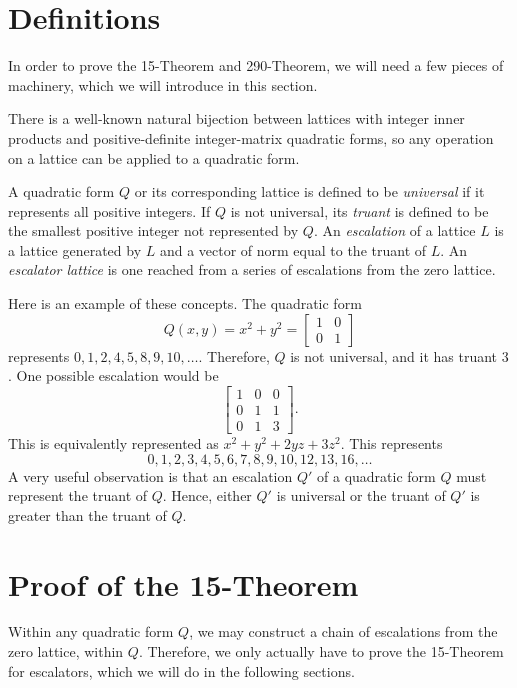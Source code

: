 \documentclass[letterpaper, 12pt]{article}
\begin{document}
\section{Definitions}
In order to prove the 15-Theorem and 290-Theorem, we will need a few pieces of machinery, which we will introduce in this section.

There is a well-known natural bijection between lattices with integer inner products and positive-definite integer-matrix quadratic forms, so any operation on a lattice can be applied to a quadratic form.

A quadratic form $Q$ or its corresponding lattice is defined to be \emph{universal} if it represents all positive integers. If $Q$ is not universal, its \emph{truant} is defined to be the smallest positive integer not represented by $Q$. An \emph{escalation} of a lattice $L$ is a lattice generated by $L$ and a vector of norm equal to the truant of $L$. An \emph{escalator lattice} is one reached from a series of escalations from the zero lattice.

Here is an example of these concepts. The quadratic form
\[Q(x, y) = x^2 + y^2 = \begin{bmatrix} 1 & 0 \\ 0 & 1 \end{bmatrix}\]
represents $0, 1, 2, 4, 5, 8, 9, 10, \ldots$. Therefore, $Q$ is not universal, and it has truant $3$. One possible escalation would be
\[\begin{bmatrix} 1 & 0 & 0 \\ 0 & 1 & 1 \\ 0 & 1 & 3 \end{bmatrix}.\]
This is equivalently represented as $x^2 + y^2 + 2yz + 3z^2$. This represents
\[0, 1, 2, 3, 4, 5, 6, 7, 8, 9, 10, 12, 13, 16, \ldots\]
A very useful observation is that an escalation $Q'$ of a quadratic form $Q$ must represent the truant of $Q$. Hence, either $Q'$ is universal or the truant of $Q'$ is greater than the truant of $Q$.

\section{Proof of the 15-Theorem}
Within any quadratic form $Q$, we may construct a chain of escalations from the zero lattice, within $Q$. Therefore, we only actually have to prove the 15-Theorem for escalators, which we will do in the following sections.
\end{document}
